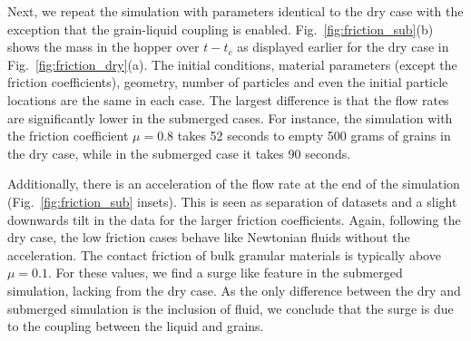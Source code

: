 \documentclass[twoside,twocolumn,9pt]{article}
\providecommand{\DIFdelbegin}{} %
\newcommand{\DIFscaledelfig}{0.5}
\newlength{\DIFdelgraphicswidth} %
\newlength{\DIFdelgraphicsheight} %
\newcommand{\DIFdelincludegraphics}[2][]{%
\sbox{\DIFdelgraphicsbox}{\DIFOincludegraphics[#1]{#2}}%
\settoboxwidth{\DIFdelgraphicswidth}{\DIFdelgraphicsbox} %
\settoboxtotalheight{\DIFdelgraphicsheight}{\DIFdelgraphicsbox} %
\scalebox{\DIFscaledelfig}{%
\parbox[b]{\DIFdelgraphicswidth}{\usebox{\DIFdelgraphicsbox}\\[-\baselineskip] \rule{\DIFdelgraphicswidth}{0em}}\llap{\resizebox{\DIFdelgraphicswidth}{\DIFdelgraphicsheight}{%
\setlength{\unitlength}{\DIFdelgraphicswidth}%
\begin{picture}(1,1)%
\thicklines\linethickness{2pt} %
{\color[rgb]{1,0,0}\put(0,0){\framebox(1,1){}}}%
{\color[rgb]{1,0,0}\put(0,0){\line( 1,1){1}}}%
{\color[rgb]{1,0,0}\put(0,1){\line(1,-1){1}}}%
\end{picture}%
}\hspace*{3pt}}} %
} %
\DeclareRobustCommand{\DIFdelbegin}{\DIFOdelbegin \let\includegraphics\DIFdelincludegraphics} %
\begin{document}
Next, we repeat the simulation with parameters identical to the dry case with the exception that the grain-liquid coupling is enabled. Fig.~\ref{fig:friction_sub}(b) shows the mass in the hopper over $t-t_{c}$ as displayed earlier for the dry case in Fig.~\ref{fig:friction_dry}(a). The initial conditions, material parameters (except the friction coefficients), geometry, number of particles and even the initial particle locations are the same in each case. The largest difference is that the flow rates are significantly lower in the submerged cases. For instance, the simulation with the friction coefficient $\mu=0.8$ takes 52 seconds to empty 500 grams of grains in the dry case, while in the submerged case it takes 90 seconds. 

Additionally, there is an acceleration of the flow rate at the end of the simulation (Fig.~\ref{fig:friction_sub} insets). This is seen as separation of datasets and a slight downwards tilt in the data for the larger friction coefficients. Again, following the dry case, the low friction cases behave like Newtonian fluids without the acceleration. The contact friction of bulk granular materials is typically above $\mu=0.1$. For these values, we find a surge like feature in the submerged simulation, lacking from the dry case. As the only difference between the dry and submerged simulation is the inclusion of fluid, we conclude that the surge is due to the coupling between the liquid and grains.
%
\DIFdelbegin %
\end{document}

